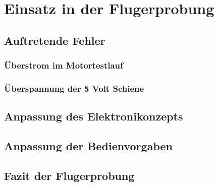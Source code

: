 \chapter{Einsatz in der Flugerprobung}\label{cha:Einsatz in der Flugerprobung}

\section{Auftretende Fehler}

\subsection{Überstrom im Motortestlauf}

\subsection{Überspannung der 5 Volt Schiene}

\section{Anpassung des Elektronikonzepts}

\section{Anpassung der Bedienvorgaben}

\section{Fazit der Flugerprobung}